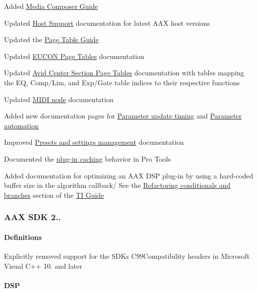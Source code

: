 \begin{DoxyItemize}
\item Added \hyperlink{a00361}{Media Composer Guide} 
\item Updated \hyperlink{a00373}{Host Support} documentation for latest A\+A\+X host versions 
\item Updated the \hyperlink{a00363}{Page Table Guide} 
\begin{DoxyItemize}
\item Updated \hyperlink{a00363_aax_page_table_guide__eucon_page_tables}{E\+U\+C\+O\+N Page Tables} documentation 
\item Updated \hyperlink{a00363_aax_page_table_guide_04_avid_center_section_page_tables}{Avid Center Section Page Tables} documentation with tables mapping the E\+Q, Comp/\+Lim, and Exp/\+Gate table indices to their respective functions 
\end{DoxyItemize}
\item Updated \hyperlink{a00206_a5e1dffce35d05990dbbad651702678e4}{M\+I\+D\+I node} documentation 
\item Added new documentation pages for \hyperlink{a00351}{Parameter update timing} and \hyperlink{a00349}{Parameter automation} 
\item Improved \hyperlink{a00360_subsection__presets_and_settings_management}{Presets and settings management} documentation 
\item Documented the \hyperlink{a00360_subsubsection__plugin_configuration_cacheing_}{plug-\/in caching} behavior in Pro Tools 
\item Added documentation for optimizing an A\+A\+X D\+S\+P plug-\/in by using a hard-\/coded buffer size in the algorithm callback/ See the \hyperlink{a00362_subsection__refactoring_conditionals_and_branches}{Refactoring conditionals and branches} section of the \hyperlink{a00362}{T\+I Guide} 
\end{DoxyItemize}\hypertarget{a00375_aax_sdk_2p1p1}{}\subsubsection{A\+A\+X S\+D\+K 2..}\label{a00375_aax_sdk_2p1p1}
\hypertarget{a00375_aax_sdk_2p1p1_Definitions}{}\paragraph{Definitions}\label{a00375_aax_sdk_2p1p1_Definitions}

\begin{DoxyItemize}
\item Explicitly removed support for the S\+D\+K\textquotesingle{}s C99\+Compatibility headers in Microsoft Visual C++ 10. and later 
\end{DoxyItemize}\hypertarget{a00375_aax_sdk_2p1p1_DSP}{}\paragraph{D\+S\+P}\label{a00375_aax_sdk_2p1p1_DSP}

